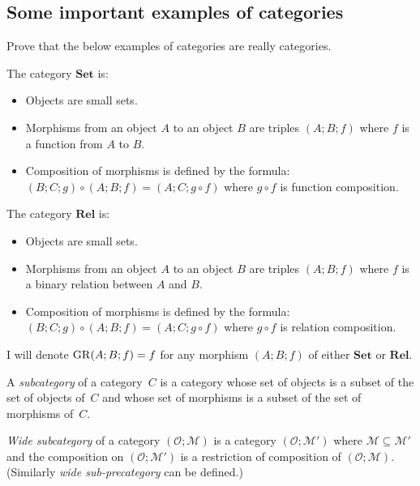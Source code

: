 \subsection{Some important examples of categories}
\begin{xca}
Prove that the below examples of categories are really categories.\end{xca}
\begin{defn}
The category $\mathbf{Set}$ is:
\begin{itemize}
\item Objects are small sets.
\item Morphisms from an object $A$ to an object $B$ are triples $(A;B;f)$
where $f$ is a function from $A$ to $B$.
\item Composition of morphisms is defined by the formula: $(B;C;g)\circ(A;B;f)=(A;C;g\circ f)$
where $g\circ f$ is function composition.
\end{itemize}
\end{defn}

\begin{defn}
The category $\mathbf{Rel}$ is:
\begin{itemize}
\item Objects are small sets.
\item Morphisms from an object $A$ to an object $B$ are triples $(A;B;f)$
where $f$ is a binary relation between $A$ and $B$.
\item Composition of morphisms is defined by the formula: $(B;C;g)\circ(A;B;f)=(A;C;g\circ f)$
where $g\circ f$ is relation composition.
\end{itemize}
\end{defn}
I will denote $\operatorname{GR}(A;B;f)=f$ for any morphism $(A;B;f)$ of either
$\mathbf{Set}$ or $\mathbf{Rel}$.


\begin{defn}
A \emph{subcategory} of a category~$C$ is a category whose set of
objects is a subset of the set of objects of~$C$ and whose set of
morphisms is a subset of the set of morphisms of~$C$.
\end{defn}

\begin{defn}
\emph{Wide subcategory} of a category $(\mathcal{O};\mathcal{M})$
is a category $(\mathcal{O};\mathcal{M}')$ where $\mathcal{M}\subseteq\mathcal{M}'$
and the composition on $(\mathcal{O};\mathcal{M}')$ is a restriction
of composition of $(\mathcal{O};\mathcal{M})$. (Similarly \emph{wide
sub-precategory} can be defined.)
\end{defn}

